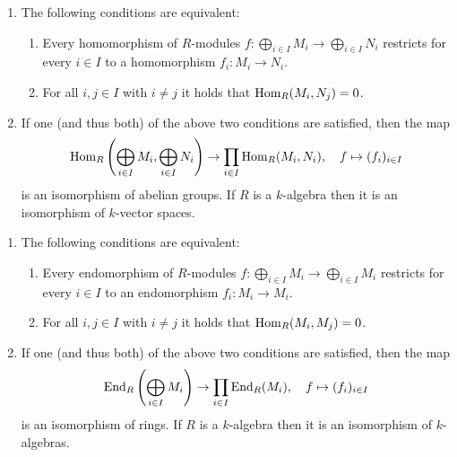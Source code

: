 \begin{proposition}
  \leavevmode
  \begin{enumerate}
    \item
      The following conditions are equivalent:
      \begin{enumerate}
        \item
          Every homomorphism of $R$-modules $f \colon \bigoplus_{i \in I} M_i \to \bigoplus_{i \in I} N_i$ restricts for every $i \in I$ to a homomorphism $f_i \colon M_i \to N_i$.
        \item
          For all $i, j \in I$ with $i \neq j$ it holds that $\operatorname{Hom}_R(M_i, N_j) = 0$.
      \end{enumerate}
    \item
      If one (and thus both) of the above two conditions are satisfied, then the map
      \[
                \operatorname{Hom}_R\left( \bigoplus_{i \in I} M_i, \bigoplus_{i \in I} N_i \right)
        \to     \prod_{i \in I} \operatorname{Hom}_R(M_i, N_i),
        \quad   f
        \mapsto (f_i)_{i \in I}
      \]
      is an isomorphism of abelian groups.
      If $R$ is a $k$-algebra then it is an isomorphism of $k$-vector spaces.
  \end{enumerate}
\end{proposition}




\begin{corollary}
  \label{corollary: decomposition of endomorphism ring into product}
  \leavevmode
  \begin{enumerate}
    \item
      The following conditions are equivalent:
      \begin{enumerate}
        \item
          Every endomorphism of $R$-modules $f \colon \bigoplus_{i \in I} M_i \to \bigoplus_{i \in I} M_i$ restricts for every $i \in I$ to an endomorphism $f_i \colon M_i \to M_i$.
        \item
          For all $i, j \in I$ with $i \neq j$ it holds that $\operatorname{Hom}_R(M_i, M_j) = 0$.
      \end{enumerate}
    \item
      If one (and thus both) of the above two conditions are satisfied, then the map
      \[
                \operatorname{End}_R\left( \bigoplus_{i \in I} M_i \right)
        \to     \prod_{i \in I} \operatorname{End}_R(M_i),
        \quad   f
        \mapsto (f_i)_{i \in I}
      \]
      is an isomorphism of rings.
      If $R$ is a $k$-algebra then it is an isomorphism of $k$-algebras.
  \end{enumerate}
\end{corollary}


